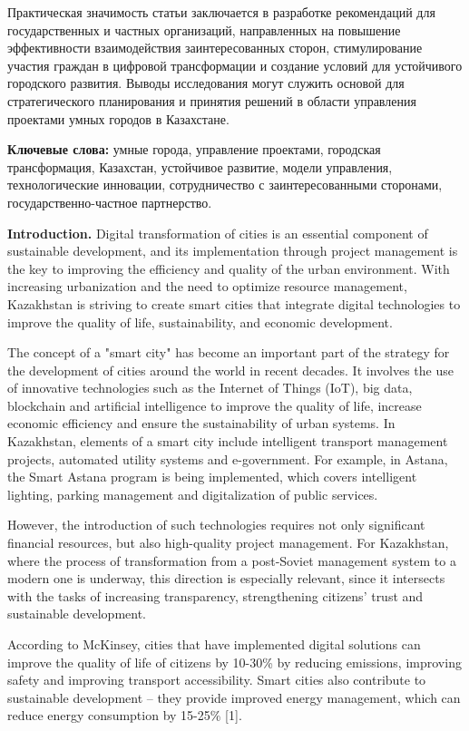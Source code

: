Практическая значимость статьи заключается в разработке рекомендаций для
государственных и частных организаций, направленных на повышение
эффективности взаимодействия заинтересованных сторон, стимулирование
участия граждан в цифровой трансформации и создание условий для
устойчивого городского развития. Выводы исследования могут служить
основой для стратегического планирования и принятия решений в области
управления проектами умных городов в Казахстане.

{\bfseries Ключевые слова:} умные города, управление проектами, городская
трансформация, Казахстан, устойчивое развитие, модели управления,
технологические инновации, сотрудничество с заинтересованными сторонами,
государственно-частное партнерство.

\begin{multicols}{2}
{\bfseries Introduction.} Digital transformation of cities is an essential
component of sustainable development, and its implementation through
project management is the key to improving the efficiency and quality of
the urban environment. With increasing urbanization and the need to
optimize resource management, Kazakhstan is striving to create smart
cities that integrate digital technologies to improve the quality of
life, sustainability, and economic development.

The concept of a "smart city" has become an important part of the
strategy for the development of cities around the world in recent
decades. It involves the use of innovative technologies such as the
Internet of Things (IoT), big data, blockchain and artificial
intelligence to improve the quality of life, increase economic
efficiency and ensure the sustainability of urban systems. In
Kazakhstan, elements of a smart city include intelligent transport
management projects, automated utility systems and e-government. For
example, in Astana, the Smart Astana program is being implemented, which
covers intelligent lighting, parking management and digitalization of
public services.

However, the introduction of such technologies requires not only
significant financial resources, but also high-quality project
management. For Kazakhstan, where the process of transformation from a
post-Soviet management system to a modern one is underway, this
direction is especially relevant, since it intersects with the tasks of
increasing transparency, strengthening citizens'{} trust
and sustainable development.

According to McKinsey, cities that have implemented digital solutions
can improve the quality of life of citizens by 10-30\% by reducing
emissions, improving safety and improving transport accessibility. Smart
cities also contribute to sustainable development -- they provide
improved energy management, which can reduce energy consumption by
15-25\% {[}1{]}.


\end{multicols}
